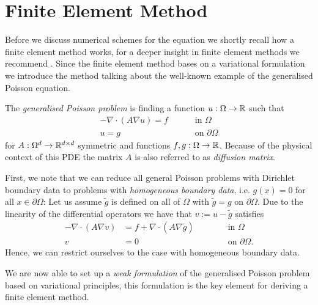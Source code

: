 \section{Finite Element Method}
Before we discuss numerical schemes for the \MA equation we shortly recall how a finite element method works, for a deeper insight in finite element methods we recommend \cite{Braess2003, BS2002}. Since the finite element method bases on a variational formulation we introduce the method talking about the well-known example of the generalised Poisson equation. 


\begin{definition} \label{def: General Poisson Problem}
The \emph{generalised Poisson problem} is finding a function $u:\Omega \rightarrow \mathbb{R}$ such that 
\begin{align}
	-\nabla \cdot (A \nabla u) = f \qquad &\text{ in }\Omega \label{eq: poisson eq} \\
	u = g \qquad &\text{ on } \partial \Omega    \label{eq: poisson bc}
\end{align}
for $ A:\Omega^d \rightarrow \mathbb{R}^{d \times d}$ symmetric and functions $f,g:\Omega \rightarrow \mathbb{R} $. 
Because of the physical context of this PDE the matrix $A$ is also referred to as \emph{diffusion matrix}.
\end{definition}

First, we note that we can reduce all general Poisson problems with Dirichlet boundary data to problems with \emph{homogeneous boundary data}, i.e. $g(x) = 0$ for all $x \in \partial \Omega$: Let us assume $\tilde g$ is defined on all of $\Omega$ with $\tilde g = g$ on $\partial \Omega$. Due to the linearity of the differential operators we have that $v:=u-\tilde g$ satisfies
\begin{align}
	-\nabla \cdot (A \nabla v) &= f + \nabla \cdot (A \nabla \tilde g)  \qquad &&\text{ in }\Omega \label{eq: poisson homogeneous eq} \\
	v &= 0 \qquad &&\text{ on } \partial \Omega.    \label{eq: poisson homogeneous bc}
\end{align}
Hence, we can restrict ourselves to the case with homogeneous boundary data.

We are now able to set up a \emph{weak formulation} of the generalised Poisson problem based on variational principles, this formulation is the key element for deriving a finite element method.

